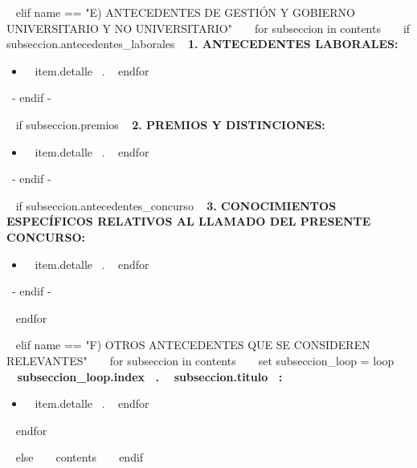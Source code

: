 ~{ elif name == "E) ANTECEDENTES DE GESTIÓN Y GOBIERNO UNIVERSITARIO Y NO UNIVERSITARIO" }~
  ~{ for subseccion in contents }~
    ~{ if subseccion.antecedentes_laborales }~
      \textbf{1. ANTECEDENTES LABORALES:}
      \begin{itemize}
      ~{ for item in subseccion.antecedentes_laborales }~
        \item ~{{ item.detalle }}~.
        \espacioEntreItems{}
      ~{ endfor }~
      \end{itemize}
      \espacioEntreSubSecciones{}
    ~{- endif -}~

    ~{ if subseccion.premios }~
      \textbf{2. PREMIOS Y DISTINCIONES:}
      \begin{itemize}
      ~{ for item in subseccion.premios }~
        \item ~{{ item.detalle }}~.
        \espacioEntreItems{}
      ~{ endfor }~
      \end{itemize}
      \espacioEntreSubSecciones{}
    ~{- endif -}~

    ~{ if subseccion.antecedentes_concurso }~
      \textbf{3. CONOCIMIENTOS ESPECÍFICOS RELATIVOS AL LLAMADO DEL PRESENTE CONCURSO:}
      \begin{itemize}
      ~{ for item in subseccion.antecedentes_concurso }~
        \item ~{{ item.detalle }}~.
        \espacioEntreItems{}
      ~{ endfor }~
      \end{itemize}
      \espacioEntreSubSecciones{}
    ~{- endif -}~

  ~{ endfor }~
  \espacioEntreSecciones{}


~{ elif name == "F) OTROS ANTECEDENTES QUE SE CONSIDEREN RELEVANTES" }~
  ~{ for subseccion in contents }~
    ~{ set subseccion_loop = loop }~
    \textbf{~{{ subseccion_loop.index }}~. ~{{ subseccion.titulo }}~:}
    \begin{itemize}
    ~{ for item in subseccion.antecedentes }~
      \item ~{{ item.detalle }}~.
      \espacioEntreItems{}
    ~{ endfor }~
    \end{itemize}
    \espacioEntreSubSecciones{}

  ~{ endfor }~
  \espacioEntreSecciones{}


~{ else }~
  ~{{ contents }}~
  \bigskip
~{ endif }~

